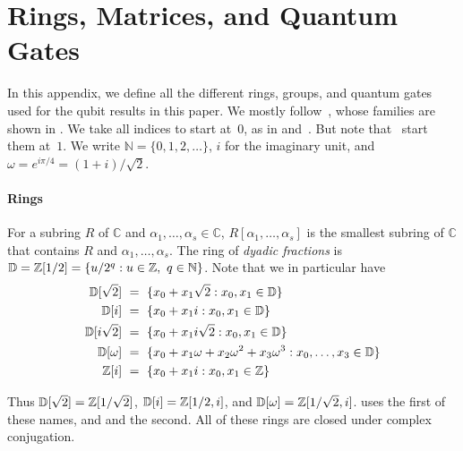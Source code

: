 \documentclass[acmsmall,screen,nonacm]{acmart}
\begin{document}



\appendix

\section{Rings, Matrices, and Quantum Gates}\label{app:rings-gates}

In this appendix, we define all the different rings, groups, and quantum gates used for the qubit results in this paper. We mostly follow~\citet{amy2020numbertheoretic}, whose families are shown in . We take all indices to start at~$0$, as in  and~\cite{bian2021un}. But note that~\cite{amy2020numbertheoretic,giles2013exact,li2021on,fang2026hadamard} start them at~$1$. We write $\mathbb N=\{0,1,2,\dots\}$, $i$ for the imaginary unit, and $\omega=e^{i\pi/4}=(1+i)/\sqrt2$.



\paragraph{Rings} For a subring $R$ of $\mathbb C$ and $\alpha_1,\dots,\alpha_s\in\mathbb C$, $R[\alpha_1,\dots,\alpha_s]$ is the smallest subring of $\mathbb C$ that contains $R$ and $\alpha_1,\dots,\alpha_s$. The ring of \emph{dyadic fractions} is $\mathbb{D}=\mathbb{Z}[1/2]=\{u/2^q : u\in\mathbb{Z},\ q\in\mathbb N\}$. 
Note that we in particular have
\begin{align*}
    \mathbb{D}[\sqrt{2}]  \ &=\ \{x_0+x_1\sqrt{2} : x_0,x_1\in\mathbb{D}\} \\
    \mathbb{D}[i]         \ &=\ \{x_0+x_1i : x_0,x_1\in\mathbb{D}\} \\
    \mathbb{D}[i\sqrt{2}] \ &=\ \{x_0+x_1i\sqrt{2} : x_0,x_1\in\mathbb{D}\} \\
    \mathbb{D}[\omega]    \ &= \ \{x_0+x_1\omega+x_2\omega^2+x_3\omega^3 : x_0,\dots,x_3\in\mathbb{D}\} \\
    \mathbb{Z}[i]         \ &= \ \{x_0+x_1i : x_0,x_1\in\mathbb{Z}\}
\end{align*}

Thus $\mathbb{D}[\sqrt2]=\mathbb{Z}[1/\sqrt2]$, $\mathbb{D}[i]=\mathbb{Z}[1/2,i]$, and $\mathbb{D}[\omega]=\mathbb{Z}[1/\sqrt2,i]$.  uses the first of these names, and  and  the second. All of these rings are closed under complex conjugation.
\end{document}
